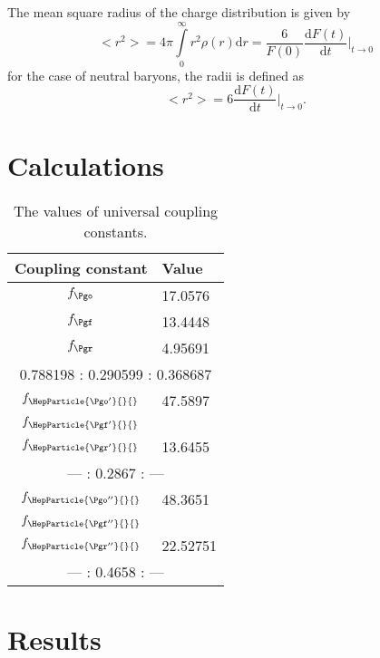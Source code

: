 \documentclass[a4paper,draft]{article}
\newcommand*{\dd}{\ensuremath{\mathrm{d}}}
\DeclareRobustCommand{\Pgos}{\HepParticle{\Pgo'}{}{}\xspace}
\DeclareRobustCommand{\Pgoss}{\HepParticle{\Pgo''}{}{}\xspace}
\DeclareRobustCommand{\Pgfs}{\HepParticle{\Pgf'}{}{}\xspace}
\DeclareRobustCommand{\Pgfss}{\HepParticle{\Pgf''}{}{}\xspace}
\DeclareRobustCommand{\Pgrs}{\HepParticle{\Pgr'}{}{}\xspace}
\DeclareRobustCommand{\Pgrss}{\HepParticle{\Pgr''}{}{}\xspace}
\begin{document}
The mean square radius of the charge distribution is given by
\begin{equation}
<r^2>=4\pi\int\limits_0^\infty r^2\rho(r) \dd r=\frac{6}{F(0)}\frac{\dd F(t)}{\dd t}\Big|_{t\to 0}
\end{equation}
for the case of neutral baryons, the radii is defined as
\begin{equation}
<r^2>=6\frac{\dd F(t)}{\dd t}\Big|_{t\to 0}.
\end{equation}


\section{Calculations}

\begin{table}[!ht]\centering
\begin{tabular}{cl}
\toprule
Coupling constant & Value \\
\midrule
$f_{\Pgo}$ & 17.0576 \\
$f_{\Pgf}$ & 13.4448 \\
$f_{\Pgr}$ & 4.95691 \\
\midrule
\multicolumn{2}{c}{0.788198 : 0.290599 : 0.368687} \\
\midrule
$f_{\Pgos}$ & 47.5897 \\
$f_{\Pgfs}$ &  \\
$f_{\Pgrs}$ & 13.6455 \\
\midrule
\multicolumn{2}{c}{--- : 0.2867 : ---} \\
\midrule
$f_{\Pgoss}$ & 48.3651 \\
$f_{\Pgfss}$ &  \\
$f_{\Pgrss}$ & 22.52751 \\
\midrule
\multicolumn{2}{c}{--- : 0.4658 : ---} \\
\bottomrule
\end{tabular}
\caption{The values of universal coupling constants.}
\label{tab:fmesons}
\end{table}

\section{Results}
\end{document}
